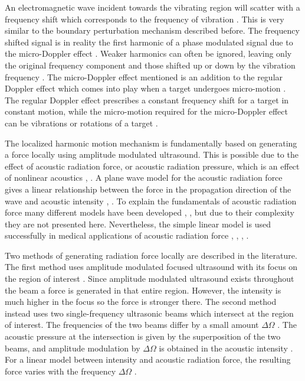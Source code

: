 \documentclass[11pt,twoside]{eitExjobb}
\begin{document}
	An electromagnetic wave incident towards the vibrating region will scatter with a frequency shift which corresponds to the frequency of vibration \cite{Top2014}. This is very similar to the boundary perturbation mechanism described before. The frequency shifted signal is in reality the first harmonic of a phase modulated signal due to the micro-Doppler effect \cite{Buerkle2007}. Weaker harmonics can often be ignored, leaving only the original frequency component and those shifted up or down by the vibration frequency \cite{Top2016}. The micro-Doppler effect mentioned is an addition to the regular Doppler effect which comes into play when a target undergoes micro-motion \cite{Chen2006}. The regular Doppler effect prescribes a constant frequency shift for a target in constant motion, while the micro-motion required for the micro-Doppler effect can be vibrations or rotations of a target \cite{Chen2006}.
	
	The localized harmonic motion mechanism is fundamentally based on generating a force locally using amplitude modulated ultrasound. This is possible due to the effect of acoustic radiation force, or acoustic radiation pressure, which is an effect of nonlinear acoustics \cite{Top2014}, \cite{Wang2018}. A plane wave model for the acoustic radiation force gives a linear relationship between the force in the propagation direction of the wave and acoustic intensity \cite{Wang2018}, \cite{Torr1984}. To explain the fundamentals of acoustic radiation force many different models have been developed \cite{Lee1993}, \cite{Hasegawa2000}, but due to their complexity they are not presented here. Nevertheless, the simple linear model is used successfully in medical applications of acoustic radiation force \cite{Fatemi1998}, \cite{Nightingale2002}, \cite{Konofagou2003}, \cite{Tafreshi2017}.
	
	Two methods of generating radiation force locally are described in the literature. The first method uses amplitude modulated focused ultrasound with its focus on the region of interest \cite{Top2016}. Since amplitude modulated ultrasound exists throughout the beam a force is generated in that entire region. However, the intensity is much higher in the focus so the force is stronger there. The second method instead uses two single-frequency ultrasonic beams which intersect at the region of interest. The frequencies of the two beams differ by a small amount $\Delta \Omega$ \cite{Fatemi1998}. The acoustic pressure at the intersection is given by the superposition of the two beams, and amplitude modulation by $\Delta \Omega$ is obtained in the acoustic intensity \cite{Fatemi1998}. For a linear model between intensity and acoustic radiation force, the resulting force varies with the frequency $\Delta \Omega$ \cite{Top2014}.
	
\end{document}
